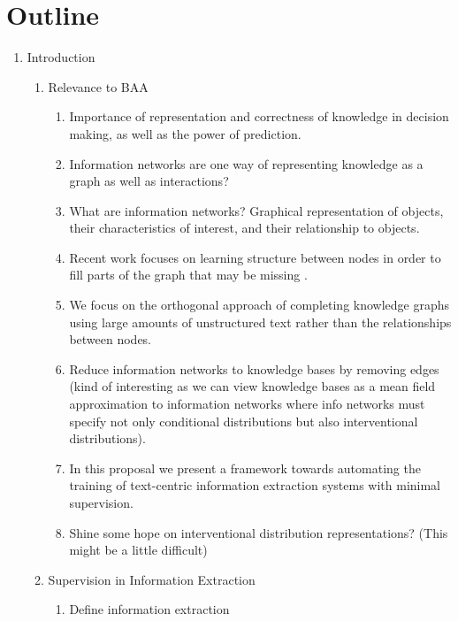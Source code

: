 \documentclass[11pt]{article}
\begin{document}
\newpage

\section*{Outline}
\begin{enumerate}
\item Introduction
    \begin{enumerate}
    \item Relevance to BAA
        \begin{enumerate}
        \item Importance of representation and correctness of knowledge in decision making,
            as well as the power of prediction.
        \item Information networks are one way of representing knowledge as a graph
            as well as interactions?
        \item What are information networks?
            Graphical representation of objects, their characteristics of interest,
            and their relationship to objects.
        \item Recent work focuses on learning structure between nodes
            in order to fill parts of the graph that may be missing \cite{chen2018diva}.
        \item We focus on the orthogonal approach of completing knowledge graphs using
            large amounts of unstructured text rather than the relationships between nodes.
        \item Reduce information networks to knowledge bases by removing edges
            (kind of interesting as we can view knowledge bases as a mean field approximation
            to information networks where info networks must specify not only
            conditional distributions but also interventional distributions).
        \item In this proposal we present a framework towards automating the
            training of text-centric information extraction systems with minimal supervision.
        \item Shine some hope on interventional distribution representations?
            (This might be a little difficult)
        \end{enumerate}
    \item Supervision in Information Extraction
        \begin{enumerate}
        \item Define information extraction
            \begin{enumerate}

\end{enumerate}
\end{enumerate}
\end{enumerate}
\end{enumerate}
\end{document}
